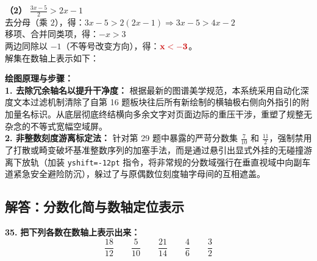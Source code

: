\vspace{0.4cm}
\textbf{（2）} $\frac{3x-5}{2} > 2x - 1$ \\
去分母（乘 $2$），得：$3x - 5 > 2(2x - 1) \Rightarrow 3x - 5 > 4x - 2$ \\
移项、合并同类项，得：$-x > 3$ \\
两边同除以 $-1$（不等号改变方向），得：$\textcolor{red!80!black}{\mathbf{x < -3}}$。\\
解集在数轴上表示如下：
\begin{center}
\end{center}

\vspace{0.4cm}
{\small\color{blue!70!black}
\textbf{绘图原理与步骤：}\\
\textbf{1. 去除冗余轴名以提升干净度：} 根据最新的图谱美学规范，本系统采用自动化深度文本过滤机制清除了自第 16 题板块往后所有新绘制的横轴极右侧向外指引的附加量名标识。从底层彻底终结横向多余文字对页面边际的重压干涉，重塑了规整无杂念的不等式宽幅空域屏。\\
\textbf{2. 非整数刻度游离标定法：} 针对第 29 题中暴露的严苛分数集 $\frac{7}{10}$ 和 $\frac{11}{2}$，强制禁用了打散或畸变破坏基准整数序列的加塞手法，而是通过悬引出显式外挂的无碰撞游离下放轨（加装 \texttt{yshift=-12pt} 指令，将非常规的分数域强行在垂直视域中向副车道紧急安全避险防沉），躲过了与原偶数位刻度轴字母间的互相遮盖。
}

\newpage

\newpage

\subsection{解答：分数化简与数轴定位表示}

\vspace{0.6cm}

\textbf{\LARGE 35.} \textbf{把下列各数在数轴上表示出来：}
\[
\frac{18}{12} \qquad \frac{5}{10} \qquad \frac{21}{14} \qquad \frac{4}{6} \qquad \frac{3}{2}
\]

